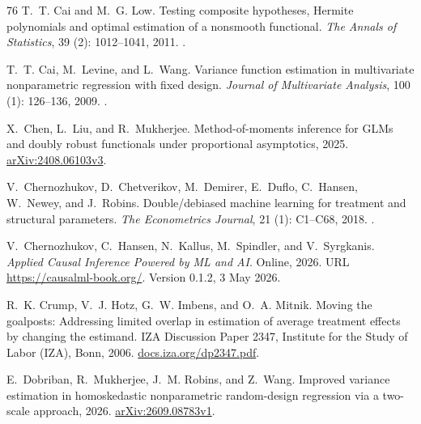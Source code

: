 \documentclass[12pt,oneside,openany]{book}
\numberwithin{equation}{chapter}
\theoremstyle{plain}
\theoremstyle{definition}
\theoremstyle{remark}
\begin{document}
\begin{thebibliography}{76}
T.~T. Cai and M.~G. Low.
\newblock Testing composite hypotheses, {Hermite} polynomials and optimal
  estimation of a nonsmooth functional.
\newblock \emph{The Annals of Statistics}, 39 (2):
  1012--1041, 2011.
\newblock {}.

T.~T. Cai, M.~Levine, and L.~Wang.
\newblock Variance function estimation in multivariate nonparametric regression
  with fixed design.
\newblock \emph{Journal of Multivariate Analysis}, 100 (1):
  126--136, 2009.
\newblock {}.

X.~Chen, L.~Liu, and R.~Mukherjee.
\newblock Method-of-moments inference for {GLMs} and doubly robust functionals
  under proportional asymptotics, 2025.
\newblock \href{https://arxiv.org/abs/2408.06103v3}{arXiv:2408.06103v3}.

V.~Chernozhukov, D.~Chetverikov, M.~Demirer, E.~Duflo, C.~Hansen, W.~Newey, and
  J.~Robins.
\newblock Double/debiased machine learning for treatment and structural
  parameters.
\newblock \emph{The Econometrics Journal}, 21 (1): C1--C68,
  2018.
\newblock {}.

V.~Chernozhukov, C.~Hansen, N.~Kallus, M.~Spindler, and V.~Syrgkanis.
\newblock \emph{Applied Causal Inference Powered by {ML} and {AI}}.
\newblock Online, 2026.
\newblock URL \url{https://causalml-book.org/}.
\newblock Version 0.1.2, 3 May 2026.

R.~K. Crump, V.~J. Hotz, G.~W. Imbens, and O.~A. Mitnik.
\newblock Moving the goalposts: Addressing limited overlap in estimation of
  average treatment effects by changing the estimand.
\newblock IZA Discussion Paper 2347, Institute for the Study of Labor (IZA),
  Bonn, 2006.
\newblock \href{https://docs.iza.org/dp2347.pdf}{docs.iza.org/dp2347.pdf}.

E.~Dobriban, R.~Mukherjee, J.~M. Robins, and Z.~Wang.
\newblock Improved variance estimation in homoskedastic nonparametric
  random-design regression via a two-scale approach, 2026.
\newblock \href{https://arxiv.org/abs/2609.08783v1}{arXiv:2609.08783v1}.


\end{thebibliography}
\end{document}
